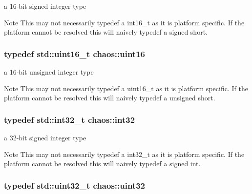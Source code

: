 a 16-\/bit signed integer type 

\begin{DoxyNote}{Note}
This may not necessarily {\ttfamily typedef} a {\ttfamily int16\+\_\+t} as it is platform specific. If the platform cannot be resolved this will naively {\ttfamily typedef} a {\ttfamily signed short}. 
\end{DoxyNote}
\hypertarget{namespacechaos_a7957eb5f7af90c890c4b14dfd3c95c5f}{}
\subsubsection[{uint16}]{\setlength{\rightskip}{0pt plus 5cm}typedef std\+::uint16\+\_\+t {\bf chaos\+::uint16}}\label{namespacechaos_a7957eb5f7af90c890c4b14dfd3c95c5f}


a 16-\/bit unsigned integer type 

\begin{DoxyNote}{Note}
This may not necessarily {\ttfamily typedef} a {\ttfamily uint16\+\_\+t} as it is platform specific. If the platform cannot be resolved this will naively {\ttfamily typedef} a {\ttfamily unsigned short}. 
\end{DoxyNote}
\hypertarget{namespacechaos_aba819cd899114dc5873e32e7b26411c4}{}
\subsubsection[{int32}]{\setlength{\rightskip}{0pt plus 5cm}typedef std\+::int32\+\_\+t {\bf chaos\+::int32}}\label{namespacechaos_aba819cd899114dc5873e32e7b26411c4}


a 32-\/bit signed integer type 

\begin{DoxyNote}{Note}
This may not necessarily {\ttfamily typedef} a {\ttfamily int32\+\_\+t} as it is platform specific. If the platform cannot be resolved this will naively {\ttfamily typedef} a {\ttfamily signed int}. 
\end{DoxyNote}
\hypertarget{namespacechaos_a8641b3ae4551f0b35570d4f9f4ec22d9}{}
\subsubsection[{uint32}]{\setlength{\rightskip}{0pt plus 5cm}typedef std\+::uint32\+\_\+t {\bf chaos\+::uint32}}\label{namespacechaos_a8641b3ae4551f0b35570d4f9f4ec22d9}


